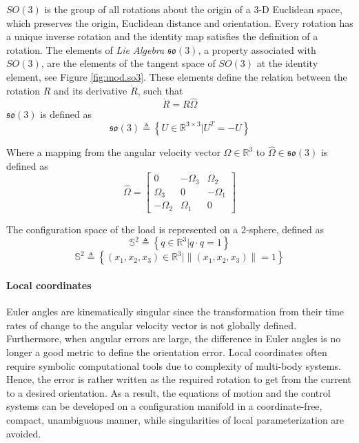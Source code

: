 
$ SO(3) $ is the group of all rotations about the origin of a 3-D Euclidean space, which preserves the origin, Euclidean distance and orientation.
Every rotation has a unique inverse rotation and the identity map satisfies the definition of a rotation. The elements of \textit{Lie Algebra} $ \mathfrak{so}(3) $, a property associated with $ SO(3) $, are the elements of the tangent space of $ SO(3) $ at the identity element, see Figure \ref{fig:mod.so3}. 
These elements define the relation between the rotation $ R $ and its derivative $ \dot{R} $, such that
\begin{equation}\label{key}
\dot{R} = R\hat{\Omega}
\end{equation}
$ \mathfrak{so}(3) $ is defined as
\begin{equation}\label{key}
\mathfrak{so}(3) \triangleq \left\lbrace U\in \mathbb{R}^{3\times 3}|U^T=-U\right\rbrace
\end{equation}

Where a mapping from the angular velocity vector $ \Omega\in\mathbb{R}^3 $ to $ \hat{\Omega}\in\mathfrak{so}(3) $ is defined as \cite{Murray1994}
\begin{equation}\label{key}
\hat{\Omega}=\begin{bmatrix}
0&-\Omega_3&\Omega_2\\
\Omega_3&0&-\Omega_1\\
-\Omega_2&\Omega_1&0
\end{bmatrix}
\end{equation}
  
The configuration space of the load is represented on a 2-sphere, defined as
\begin{equation}\label{key}
\mathbb{S}^2 \triangleq \left\lbrace q\in\mathbb{R}^{3}|q\cdot q=1\right\rbrace 
\end{equation}
\begin{equation}\label{key}
\mathbb{S}^2 \triangleq \left\lbrace (x_1, x_2, x_3)\in\mathbb{R}^{3}| \parallel (x_1, x_2, x_3)\parallel=1\right\rbrace 
\end{equation}

\paragraph{Local coordinates} Euler angles are kinematically singular since the transformation from their time rates of change to the angular velocity vector is not globally defined. Furthermore, when angular errors are large, the difference in Euler angles is no longer a good metric to define the orientation error. Local coordinates often require symbolic computational tools due to complexity of multi-body systems. Hence, the error is rather written as the required rotation to get from the current to a desired orientation. As a result, the equations of motion and the control systems can be developed on a configuration manifold in a coordinate-free, compact, unambiguous manner, while singularities of local parameterization are avoided.

